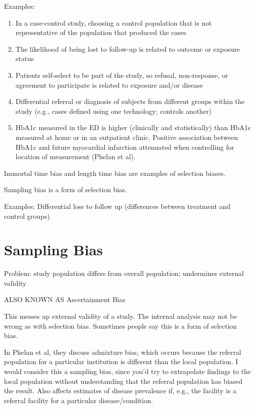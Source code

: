 Examples: 
\begin{enumerate}
\item In a case-control study, choosing a control population that is not representative of the population that produced the cases
\item The likelihood of being lost to follow-up is related to outcome or exposure status
\item Patients self-select to be part of the study, so refusal, non-response, or agreement to participate is related to exposure and/or disease
\item Differential referral or diagnosis of subjects from different groups within the study (e.g., cases defined using one technology; controls another)
\item HbA1c measured in the ED is higher (clinically and statistically) than HbA1c measured at home or in an outpatient clinic. Positive association between HbA1c and future myocardial infarction attenuated when controlling for location of measurement (Phelan et al).
\end{enumerate}

Immortal time bias and length time bias are examples of selection biases. 

Sampling bias is a form of selection bias. 

Examples: Differential loss to follow up (differences between treatment and control groups)


\section{Sampling Bias}

Problem: study population differs from overall population; undermines external validity

ALSO KNOWN AS Ascertainment Bias

This messes up external validity of a study. The internal analysis may not be wrong as with selection bias. Sometimes people say this is a form of selection bias. 

In Phelan et al, they discuss admixture bias, which occurs because the referral population for a particular institution is different than the local population. I would consider this a sampling bias, since you'd try to extrapolate findings to the local population without understanding that the referral population has biased the result. Also affects estimates of disease prevalence if, e.g., the facility is a referral facility for a particular disease/condition. 

